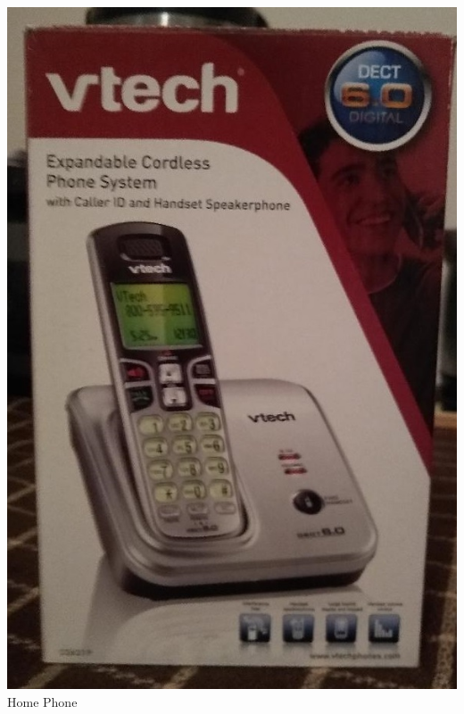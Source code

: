 \documentclass[t]{beamer}
\newcommand{\htarget}[2]{\hypertarget{#1}{#2}}
\begin{document}
\begin{frame}\htarget{phone}{} \begin{center}
\includegraphics[height=0.8\textheight]{home_phone_mini.jpg} \\
Home Phone
\end{center} \end{frame}
\end{document}
